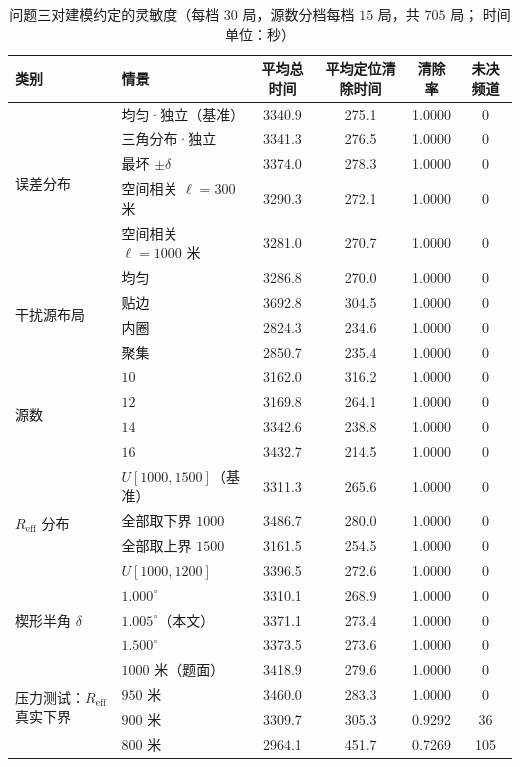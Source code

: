 \documentclass[withoutpreface, bwprint]{cumcmthesis}
\begin{document}
\begin{appendices}
\begin{table}[htbp]
  \centering
  \caption{问题三对建模约定的灵敏度（每档 $30$ 局，源数分档每档 $15$ 局，共 $705$ 局；
    时间单位：秒）}
  \label{tab:p3sens}
  \footnotesize
  \begin{tabular}{llcccc}
    \toprule
    类别 & 情景 & 平均总时间 & 平均定位清除时间 & 清除率 & 未决频道 \\
    \midrule
    \multirow{5}{*}{误差分布} & 均匀·独立（基准） & 3340.9 & 275.1 & 1.0000 & 0 \\
      & 三角分布·独立 & 3341.3 & 276.5 & 1.0000 & 0 \\
      & 最坏 $\pm\delta$ & 3374.0 & 278.3 & 1.0000 & 0 \\
      & 空间相关 $\ell=300$ 米 & 3290.3 & 272.1 & 1.0000 & 0 \\
      & 空间相关 $\ell=1000$ 米 & 3281.0 & 270.7 & 1.0000 & 0 \\
    \midrule
    \multirow{4}{*}{干扰源布局} & 均匀 & 3286.8 & 270.0 & 1.0000 & 0 \\
      & 贴边 & 3692.8 & 304.5 & 1.0000 & 0 \\
      & 内圈 & 2824.3 & 234.6 & 1.0000 & 0 \\
      & 聚集 & 2850.7 & 235.4 & 1.0000 & 0 \\
    \midrule
    \multirow{4}{*}{源数} & $10$ & 3162.0 & 316.2 & 1.0000 & 0 \\
      & $12$ & 3169.8 & 264.1 & 1.0000 & 0 \\
      & $14$ & 3342.6 & 238.8 & 1.0000 & 0 \\
      & $16$ & 3432.7 & 214.5 & 1.0000 & 0 \\
    \midrule
    \multirow{4}{*}{$R_{\mathrm{eff}}$ 分布} & $U[1000,1500]$（基准） & 3311.3 & 265.6 & 1.0000 & 0 \\
      & 全部取下界 $1000$ & 3486.7 & 280.0 & 1.0000 & 0 \\
      & 全部取上界 $1500$ & 3161.5 & 254.5 & 1.0000 & 0 \\
      & $U[1000,1200]$ & 3396.5 & 272.6 & 1.0000 & 0 \\
    \midrule
    \multirow{3}{*}{楔形半角 $\delta$} & $1.000^\circ$ & 3310.1 & 268.9 & 1.0000 & 0 \\
      & $1.005^\circ$（本文） & 3371.1 & 273.4 & 1.0000 & 0 \\
      & $1.500^\circ$ & 3373.5 & 273.6 & 1.0000 & 0 \\
    \midrule
    \multirow{4}{*}{压力测试：$R_{\mathrm{eff}}$ 真实下界} & $1000$ 米（题面） & 3418.9 & 279.6 & 1.0000 & 0 \\
      & $950$ 米 & 3460.0 & 283.3 & 1.0000 & 0 \\
      & $900$ 米 & 3309.7 & 305.3 & 0.9292 & 36 \\
      & $800$ 米 & 2964.1 & 451.7 & 0.7269 & 105 \\
    \bottomrule
  \end{tabular}
\end{table}


\end{appendices}
\end{document}
